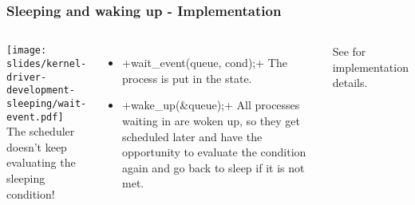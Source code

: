 \begin{frame}[fragile]
  \frametitle{Sleeping and waking up - Implementation}
  \begin{columns}
      \texttt{[image: slides/kernel-driver-development-sleeping/wait-event.pdf]}\\
       The scheduler doesn't keep evaluating the sleeping condition!
       \begin{itemize}
       \item {}+wait_event(queue, cond);+
         The process is put in the  state.
       \item {}+wake_up(&queue);+
         All processes waiting in  are woken up, so they get
         scheduled later and have the opportunity to evaluate the
         condition again and go back to sleep if it is not met.
       \end{itemize}
       See  for implementation details.
  \end{columns}
\end{frame}
